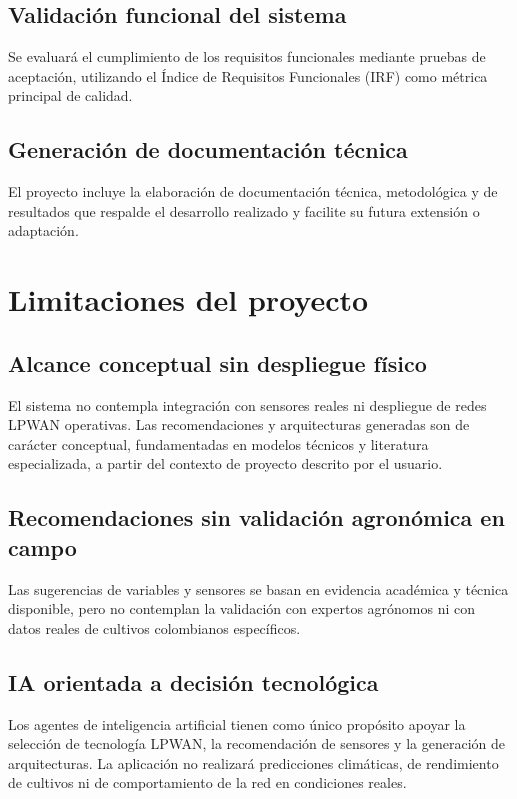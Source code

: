 \subsection{Validación funcional del sistema} Se evaluará el cumplimiento de los
requisitos funcionales mediante pruebas de aceptación, utilizando el  Índice  de
Requisitos Funcionales (IRF) como métrica principal de calidad.

\subsection{Generación  de  documentación  técnica}  El  proyecto   incluye   la
elaboración de documentación técnica, metodológica y de resultados que  respalde
el desarrollo realizado y facilite su futura extensión o adaptación.


\section{Limitaciones del proyecto}

\subsection{Alcance conceptual sin despliegue físico}
El sistema no contempla integración con sensores reales ni
despliegue de redes LPWAN operativas. Las recomendaciones y
arquitecturas generadas son de carácter conceptual,
fundamentadas en modelos técnicos y literatura especializada,
a partir del contexto de proyecto descrito por el usuario.

\subsection{Recomendaciones sin validación agronómica en campo}
Las sugerencias de variables y sensores se basan en evidencia
académica y técnica disponible, pero no contemplan la validación
con expertos agrónomos ni con datos reales de cultivos colombianos
específicos.

\subsection{IA orientada a decisión tecnológica}
Los agentes de inteligencia artificial tienen como único propósito
apoyar la selección de tecnología LPWAN, la recomendación de
sensores y la generación de arquitecturas. La aplicación no realizará
predicciones climáticas, de rendimiento de cultivos ni de
comportamiento de la red en condiciones reales.

